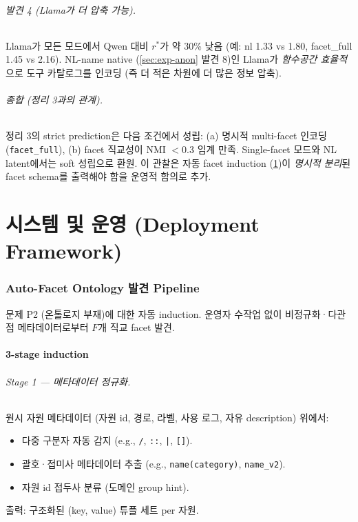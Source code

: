 \documentclass[11pt]{article}
\theoremstyle{definition}
\begin{document}
\paragraph{발견 4 (Llama가 더 압축 가능).}
Llama가 모든 모드에서 Qwen 대비 $r^*$가 약 30\% 낮음 (예: nl 1.33 vs 1.80, facet\_full 1.45 vs 2.16). NL-name native (\cref{sec:exp-anon} 발견 8)인 Llama가 \emph{함수공간 효율적}으로 도구 카탈로그를 인코딩 (즉 더 적은 차원에 더 많은 정보 압축).

\paragraph{종합 (정리 3과의 관계).}
정리 3의 strict prediction은 다음 조건에서 성립: (a) 명시적 multi-facet 인코딩 (\texttt{facet\_full}), (b) facet 직교성이 NMI $< 0.3$ 임계 만족. Single-facet 모드와 NL latent에서는 soft 성립으로 환원. 이 관찰은 자동 facet induction (\cref{sec:auto-facet})이 \emph{명시적 분리}된 facet schema를 출력해야 함을 운영적 함의로 추가.

\part{시스템 및 운영 (Deployment Framework)}

\section{Auto-Facet Ontology 발견 Pipeline}
\label{sec:auto-facet}

문제 P2 (온톨로지 부재)에 대한 자동 induction. 운영자 수작업 없이 비정규화·다관점 메타데이터로부터 $F$개 직교 facet 발견.

\subsection{3-stage induction}
\label{sec:auto-facet-stages}

\paragraph{Stage 1 — 메타데이터 정규화.}
원시 자원 메타데이터 (자원 id, 경로, 라벨, 사용 로그, 자유 description) 위에서:
\begin{itemize}[leftmargin=*]
\item 다중 구분자 자동 감지 (e.g., \texttt{/}, \texttt{::}, \texttt{|}, \texttt{[]}).
\item 괄호·접미사 메타데이터 추출 (e.g., \texttt{name(category)}, \texttt{name\_v2}).
\item 자원 id 접두사 분류 (도메인 group hint).
\end{itemize}
출력: 구조화된 (key, value) 튜플 세트 per 자원.
\end{document}
